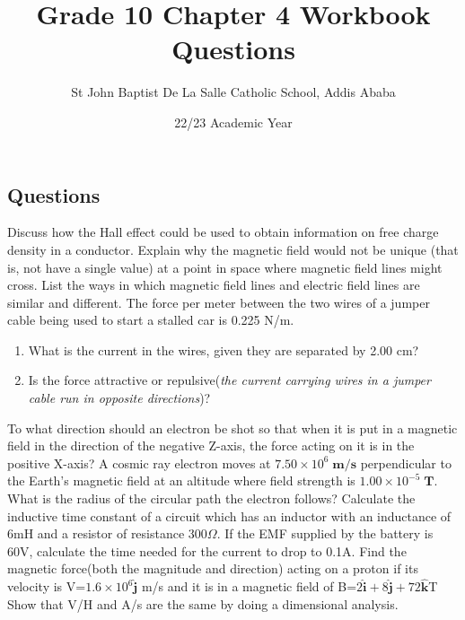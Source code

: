 \documentclass[12pt,addpoints]{exam}
\author{St John Baptist De La Salle Catholic School, Addis Ababa}
\date{22/23 Academic Year}
\begin{document}
	\title{Grade 10 Chapter 4 Workbook Questions}
	\maketitle
	
	\begin{center}
		\subsection*{Questions}
	\end{center}
	
	
	\begin{questions}
		\question Discuss how the Hall effect could be used to obtain information on free charge density in a conductor.
		\question Explain why the magnetic field would not be unique (that is, not have a single value) at a point in space where magnetic
		field lines might cross. 
		\question List the ways in which magnetic field lines and electric field lines are similar and different.
		\question The force per meter between the two wires of a jumper cable being used to start a stalled car is 0.225 N/m. 
		\begin{enumerate}[label=(\roman*)]
			\item What is the current in the wires, given they are separated by 2.00 cm?
			\item Is the force attractive or repulsive(\textit{the current carrying wires in a jumper cable run in opposite directions})?
		\end{enumerate}
		\question To what direction should an electron be shot so that when it is put in a magnetic field in the direction of the negative Z-axis, the force acting on it is in the positive X-axis?
		\question A cosmic ray electron moves at $ 7.50 \times 10^6 \;\textbf{m/s}$ perpendicular to the Earth’s magnetic field at an altitude where field strength is $1.00 \times 10^{-5} \;\textbf{T} $. What is the radius of the circular path the electron follows?
		\question Calculate the inductive time constant of a circuit which has an inductor with an inductance of 6mH and a resistor of resistance 300$\varOmega$. If the EMF supplied by the battery is 60V, calculate the time needed for the current to drop to 0.1A. 
		\question Find the magnetic force(both the magnitude and direction) acting on a proton if its velocity is V=$1.6\times10^6\hat{\boldsymbol{j}}$ m/s and it is in a magnetic field of B=$2\hat{\boldsymbol{i}} + 8\hat{\boldsymbol{j}} + 72\hat{\boldsymbol{k}}$T
		\question Show that V/H and A/s are the same by doing a dimensional analysis.

\end{questions}
\end{document}
